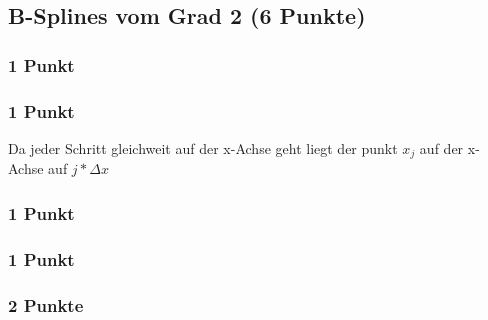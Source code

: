 \newif\ifvimbug
\vimbugfalse

\ifvimbug

\fi


\subsection{B-Splines vom Grad 2 (6 Punkte)}
\subsubsection{1 Punkt}

\subsubsection{1 Punkt}
Da jeder Schritt gleichweit auf der x-Achse geht liegt der punkt $x_j$ auf der x-Achse auf $j*\Delta{x}$
\subsubsection{1 Punkt}

\subsubsection{1 Punkt}

\subsubsection{2 Punkte}